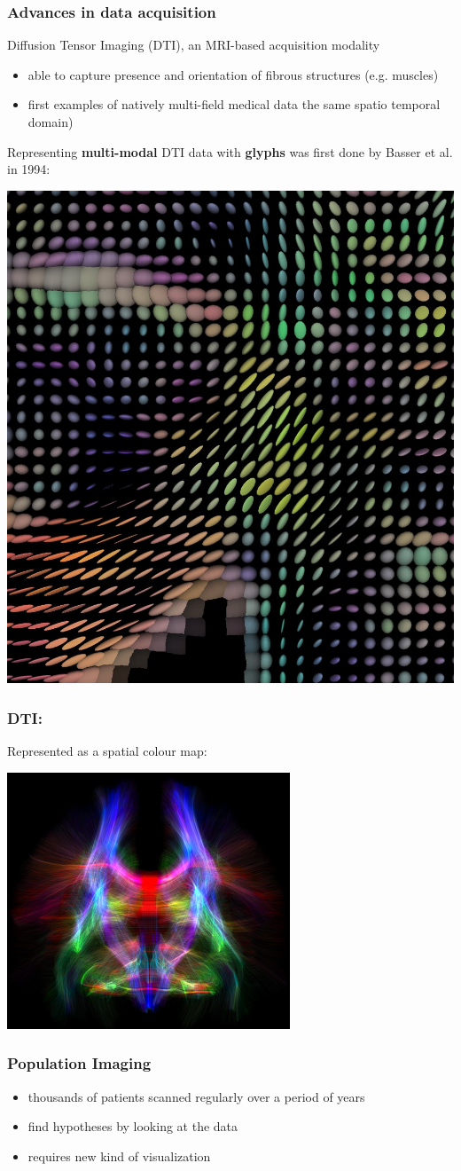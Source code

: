 \documentclass{beamer}
\begin{document}
\begin{frame}
	\frametitle{Advances in data acquisition} %
	Diffusion Tensor Imaging (DTI), an MRI-based acquisition modality
	\begin{itemize}
		\item able to capture presence and orientation of fibrous structures
(e.g. muscles)
		\item first examples of natively multi-field medical data %
the same spatio temporal domain)
	\end{itemize}
	Representing \textbf{multi-modal} DTI data with \textbf{glyphs} was first
	done by Basser et al. in 1994:
	\begin{center}
		\includegraphics[width=.4\textwidth]{images/dti}
	\end{center}
\end{frame}

\begin{frame}
	\frametitle{DTI:}
	Represented as a spatial colour map:
	\begin{center}
		\includegraphics[width=.6\textwidth]{images/tractography}
	\end{center}
\end{frame}

\begin{frame}
	\frametitle{Population Imaging}
	\begin{itemize}
		\item thousands of patients scanned regularly over a period of years
		\item find hypotheses by looking at the data
		\item requires new kind of visualization
	\end{itemize}
\end{frame}
\end{document}

